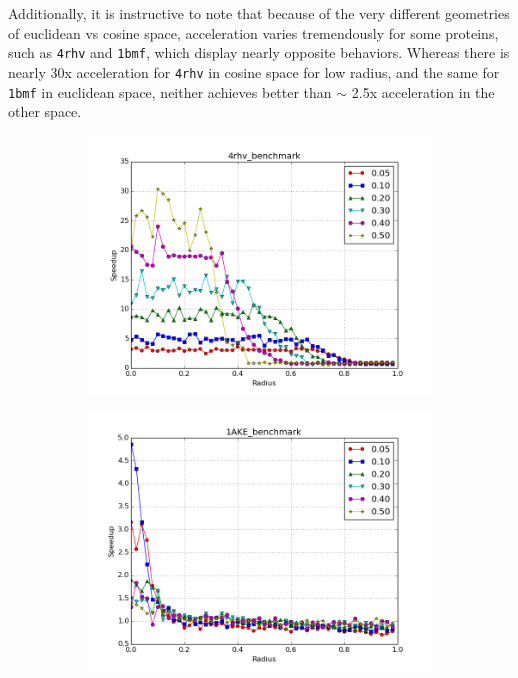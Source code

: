 \documentclass[review,preprint,12pt]{elsarticle}
\theoremstyle{definition}
\theoremstyle{remark}
\numberwithin{equation}{section}
\begin{document}
Additionally, it is instructive to note that because of the very different geometries of euclidean vs cosine space, acceleration varies tremendously for some proteins, such as \texttt{4rhv} and \texttt{1bmf}, which display nearly opposite behaviors.
Whereas there is nearly 30x acceleration for \texttt{4rhv} in cosine space for low radius, and the same for \texttt{1bmf} in euclidean space, neither achieves better than $\sim$ 2.5x acceleration in the other space.

\begin{figure}[tbp]
    \centering
    \begin{subfigure}[b]{0.49\textwidth}
        \includegraphics[width=1\textwidth]{assets/4rhv_benchmark_cosine}
        \caption{}
    \end{subfigure}%
    \begin{subfigure}[b]{0.49\textwidth}
        \includegraphics[width=1\textwidth]{assets/1AKE_benchmark_cosine}

\end{subfigure}
\end{figure}
\end{document}
